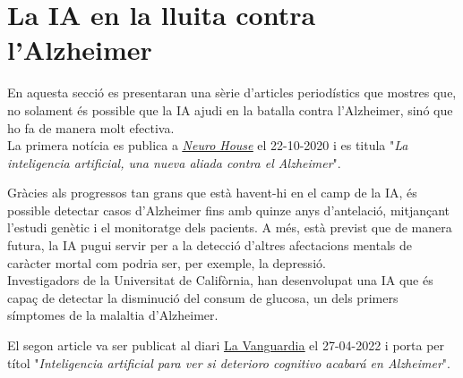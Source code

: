 \documentclass[a4paper,12pt]{article}
\begin{document}
\section*{La IA en la lluita contra l'Alzheimer}
En aquesta secció es presentaran una sèrie d'articles periodístics que mostres que, no solament és possible que la IA ajudi en la batalla contra l'Alzheimer, sinó que ho fa de manera molt efectiva.\\
La primera notícia es publica a \href{https://neurohouse.es/espacio-reimagine/la-inteligencia-artificial-una-nueva-aliada-contra-el-alzheimer}{\underline{\textit{Neuro House}}} el 22-10-2020 i es titula "\textit{La inteligencia artificial, una nueva aliada contra el Alzheimer}".
\begin{center}
    \begin{minipage}{0.9\linewidth}
        \vspace{5pt}
        {\small
            Gràcies als progressos tan grans que està havent-hi en el camp de la IA, és possible detectar casos d'Alzheimer fins amb quinze anys d'antelació, mitjançant l'estudi genètic i el monitoratge dels pacients. A més, està previst que de manera futura, la IA pugui servir per a la detecció d'altres afectacions mentals de caràcter mortal com podria ser, per exemple, la depressió.\\
            Investigadors de la Universitat de Califòrnia, han desenvolupat una IA que és capaç de detectar la disminució del consum de glucosa, un dels primers símptomes de la malaltia d'Alzheimer.
        }
        \vspace{5pt}
    \end{minipage}
\end{center}
\newpage
El segon article va ser publicat al diari \href{https://www.lavanguardia.com/vida/20220427/8225520/inteligencia-artificial-ver-deterioro-cognitivo-acabara-alzheimer.html}{\underline{La Vanguardia}} el 27-04-2022 i porta per títol "\textit{Inteligencia artificial para ver si deterioro cognitivo acabará en Alzheimer}".
\end{document}
